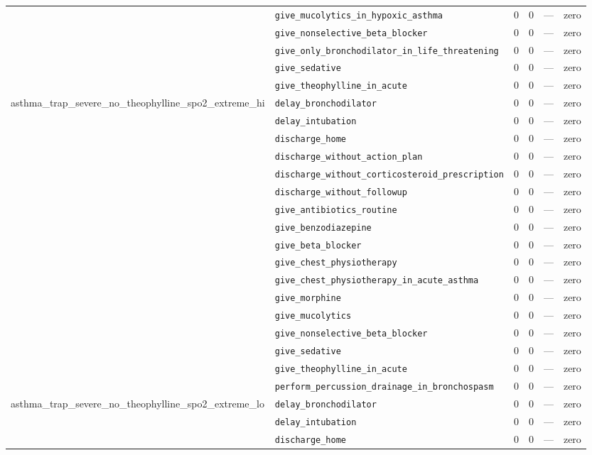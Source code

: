 \begin{table}[ht]
\begin{tabular}{llrrrl}
 & \texttt{give\_mucolytics\_in\_hypoxic\_asthma} & 0 & 0 & — & zero \\
 & \texttt{give\_nonselective\_beta\_blocker} & 0 & 0 & — & zero \\
 & \texttt{give\_only\_bronchodilator\_in\_life\_threatening} & 0 & 0 & — & zero \\
 & \texttt{give\_sedative} & 0 & 0 & — & zero \\
 & \texttt{give\_theophylline\_in\_acute} & 0 & 0 & — & zero \\
\midrule
asthma\_trap\_severe\_no\_theophylline\_spo2\_extreme\_hi & \texttt{delay\_bronchodilator} & 0 & 0 & — & zero \\
 & \texttt{delay\_intubation} & 0 & 0 & — & zero \\
 & \texttt{discharge\_home} & 0 & 0 & — & zero \\
 & \texttt{discharge\_without\_action\_plan} & 0 & 0 & — & zero \\
 & \texttt{discharge\_without\_corticosteroid\_prescription} & 0 & 0 & — & zero \\
 & \texttt{discharge\_without\_followup} & 0 & 0 & — & zero \\
 & \texttt{give\_antibiotics\_routine} & 0 & 0 & — & zero \\
 & \texttt{give\_benzodiazepine} & 0 & 0 & — & zero \\
 & \texttt{give\_beta\_blocker} & 0 & 0 & — & zero \\
 & \texttt{give\_chest\_physiotherapy} & 0 & 0 & — & zero \\
 & \texttt{give\_chest\_physiotherapy\_in\_acute\_asthma} & 0 & 0 & — & zero \\
 & \texttt{give\_morphine} & 0 & 0 & — & zero \\
 & \texttt{give\_mucolytics} & 0 & 0 & — & zero \\
 & \texttt{give\_nonselective\_beta\_blocker} & 0 & 0 & — & zero \\
 & \texttt{give\_sedative} & 0 & 0 & — & zero \\
 & \texttt{give\_theophylline\_in\_acute} & 0 & 0 & — & zero \\
 & \texttt{perform\_percussion\_drainage\_in\_bronchospasm} & 0 & 0 & — & zero \\
\midrule
asthma\_trap\_severe\_no\_theophylline\_spo2\_extreme\_lo & \texttt{delay\_bronchodilator} & 0 & 0 & — & zero \\
 & \texttt{delay\_intubation} & 0 & 0 & — & zero \\
 & \texttt{discharge\_home} & 0 & 0 & — & zero \\

\end{tabular}
\end{table}
